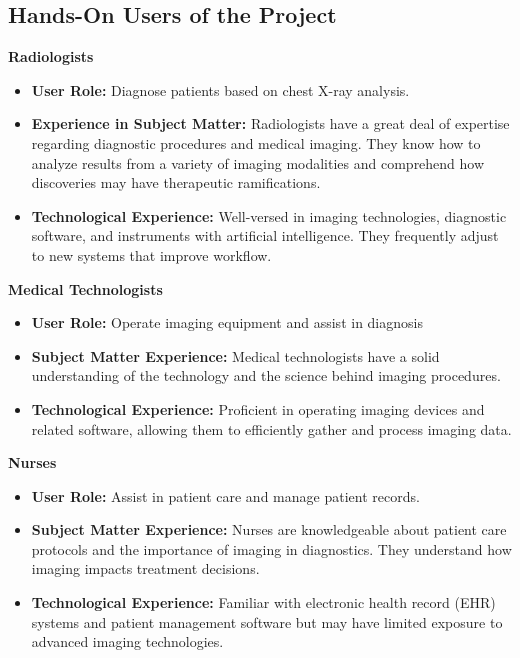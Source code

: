 \documentclass[12pt]{article}
\begin{document}
\subsection{Hands-On Users of the Project}

\textbf{Radiologists}
\begin{itemize}
    \item {\textbf{User Role: } Diagnose patients based on chest X-ray analysis.}
    \item {
        \textbf{Experience in Subject Matter: } Radiologists have a great deal of expertise 
        regarding diagnostic procedures and medical imaging. They know how to analyze results from
         a variety of imaging modalities and comprehend how discoveries may have therapeutic 
        ramifications.
    }
    \item {
        \textbf{Technological Experience: } Well-versed in imaging technologies, diagnostic software, and instruments with artificial intelligence. They frequently adjust to new systems that improve workflow.
    }
\end{itemize}

\textbf{Medical Technologists}
\begin{itemize}
    \item {\textbf{User Role: } Operate imaging equipment and assist in diagnosis}
    \item {
        \textbf{Subject Matter Experience: } Medical technologists have a solid understanding 
        of the technology and the science behind imaging procedures.
    }
    \item {
        \textbf{Technological Experience: } Proficient in operating imaging devices and related 
        software, allowing them to efficiently gather and process imaging data.
    }
\end{itemize}

\textbf{Nurses}
\begin{itemize}
    \item {\textbf{User Role: } Assist in patient care and manage patient records.}
    \item {
        \textbf{Subject Matter Experience: } Nurses are knowledgeable about patient care protocols
         and the importance of imaging in diagnostics. They understand how imaging impacts 
         treatment decisions.
    }
    \item {
        \textbf{Technological Experience: } Familiar with electronic health record (EHR) systems 
        and patient management software but may have limited exposure to advanced imaging 
        technologies.
    }
\end{itemize}
\end{document}
